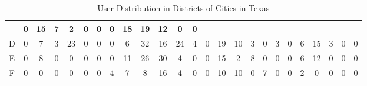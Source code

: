 \begin{table*}
\begin{tabular}{|c|c|c|c|c|c|c|c|c|c|c|c|c|c|c|c|c|c|c|c|c|c|c|c|c|}
& 0& 15& 7& 2& 0& 0 
& 0& 18& 19& 12& 0& 0 \\
\hline
D
& 0& 7& 3& 23& 0& 0
& 0& 6& 32& 16& 24& 4
& 0& 19& 10& 3& 0& 3 
& 0& 6& 15& 3& 0& 0 \\
\hline
E
& 0& 8& 0& 0& 0& 0
& 0& 11& 26& 30& 4& 0 
& 0& 15& 2& 8& 0& 0
& 0& 6& 12& 0& 0& 0 \\
\hline
F
& 0& 0& 0& 0& 0& 0 
& 4& 7& 8& \underline{16}& 4& 0
& 0& 10& 10& 0& 7& 0
& 0& 2& 0& 0& 0& 0 \\
\hline
\end{tabular}	
\vspace*{0.1in} \\	
\label{table:cluster}	
\caption{User Distribution in Districts of Cities in Texas}	
\end{table*}	
